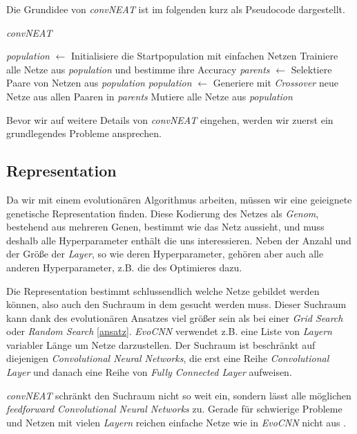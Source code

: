 \documentclass[]{scrartcl}
\begin{document}
		Die Grundidee von \textit{convNEAT} ist im folgenden kurz als Pseudocode dargestellt.

		\begin{algorithm}
			\caption{\textit{convNEAT}}\label{pseudo}
			\begin{algorithmic}
				\State \textit{population} $\gets$ Initialisiere die Startpopulation mit einfachen Netzen
					\State Trainiere alle Netze aus \textit{population} und bestimme ihre Accuracy
					\State \textit{parents} $\gets$ Selektiere Paare von Netzen aus \textit{population}
					\State \textit{population} $\gets$ Generiere mit \textit{Crossover} neue Netze aus allen Paaren in \textit{parents}
					\State Mutiere alle Netze aus \textit{population}
				\EndWhile
			\end{algorithmic}
		\end{algorithm}
		
		Bevor wir auf weitere Details von \textit{convNEAT} eingehen, werden wir zuerst ein grundlegendes Probleme ansprechen.

		\subsection{Representation}

			Da wir mit einem evolutionären Algorithmus arbeiten, müssen wir eine geieignete genetische Representation finden.
			Diese Kodierung des Netzes als \textit{Genom}, bestehend aus mehreren Genen, bestimmt wie das Netz aussieht, und muss deshalb alle Hyperparameter enthält die uns interessieren.
			Neben der Anzahl und der Größe der \textit{Layer}, so wie deren Hyperparameter, gehören aber auch alle anderen Hyperparameter, z.B. 
			die des Optimieres dazu.

			Die Representation bestimmt schlussendlich welche Netze gebildet werden können, also auch den Suchraum in dem gesucht werden muss.
			Dieser Suchraum kann dank des evolutionären Ansatzes viel größer sein als bei einer \textit{Grid Search} oder \textit{Random Search} \ref{ansatz}.
			\textit{EvoCNN} verwendet z.B. eine Liste von \textit{Layern} variabler Länge um Netze darzustellen.
			Der Suchraum ist beschränkt auf diejenigen \textit{Convolutional Neural Networks}, die erst eine Reihe \textit{Convolutional Layer}
			und danach eine Reihe von \textit{Fully Connected Layer} aufweisen. 

			\textit{convNEAT} schränkt den Suchraum nicht so weit ein, sondern lässt alle möglichen \textit{feedforward Convolutional Neural Networks} zu.
			Gerade für schwierige Probleme und Netzen mit vielen \textit{Layern} reichen einfache Netze wie in \textit{EvoCNN} nicht aus \cite{deep}.
\end{document}
